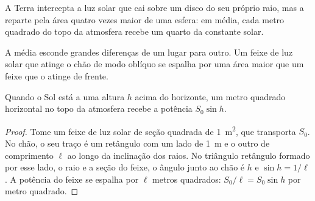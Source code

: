 \begin{omfigure}

{\small A Terra intercepta a luz solar que cai sobre um disco do seu próprio
raio, mas a reparte pela área quatro vezes maior de uma esfera: em média,
cada metro quadrado do topo da atmosfera recebe um quarto da constante
solar.}
\end{omfigure}

A média esconde grandes diferenças de um lugar para outro. Um feixe de luz
solar que atinge o chão de modo oblíquo se espalha por uma área maior que um
feixe que o atinge de frente.

\begin{proposition}\label{prop:g10:earth-energy-budget:height}
Quando o Sol está a uma altura $h$ acima do horizonte, um metro quadrado
horizontal no topo da atmosfera recebe a potência $S_0 \sin h$.
\end{proposition}

\begin{proof}
Tome um feixe de luz solar de seção quadrada de \qty{1}{m^2}, que
transporta $S_0$. No chão, o seu traço é um retângulo com um lado de
\qty{1}{m} e o outro de comprimento $\ell$ ao longo da inclinação dos raios.
No triângulo retângulo formado por esse lado, o raio e a seção do feixe, o
ângulo junto ao chão é $h$ e $\sin h = 1/\ell$. A potência do feixe se
espalha por $\ell$ metros quadrados: $S_0/\ell = S_0 \sin h$ por metro
quadrado.
\end{proof}

